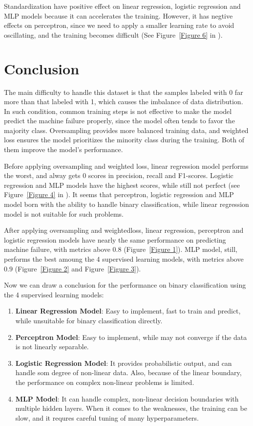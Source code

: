 \documentclass{article}
\begin{document}
Standardization have positive effect on linear regression, logistic regression and MLP
models because it can accelerates the training. However, it has negtive effects on
perceptron, since we need to apply a smaller learning rate to avoid oscillating, and
the training becomes difficult (See Figure~\ref{Figure 6} in ).

\section{Conclusion}
The main difficulty to handle this dataset is that the samples labeled with 0 far more
than that labeled with 1, which causes the imbalance of data distribution. In such
condition, common training steps is not effective to make the model predict the
machine failure properly, since the model often tends to favor the majority class.
Oversampling provides more balanced training data, and weighted loss ensures the model
prioritizes the minority class during the training. Both of them improve the model's
performance.

Before applying oversampling and weighted loss, linear regression model performs the
worst, and alway gets 0 scores in precision, recall and F1-scores. Logistic regression and
MLP models have the highest scores, while still not perfect (see Figure~\ref{Figure 4} in ). 
It seems that perceptron, logistic
regression and MLP model born with the ability to handle binary classification, while
linear regression model is not suitable for such problems.

After applying oversampling and weightedloss, linear regression, perceptron and 
logistic regression models have nearly the same performance on predicting machine 
failure, with metrics above $0.8$ (Figure~\ref{Figure 1}). MLP model, still, performs the best amoung the
4 supervised learning models, with metrics above $0.9$ (Figure~\ref{Figure 2} and Figure~\ref{Figure 3}).

Now we can draw a conclusion for the performance on binary classification using the
4 supervised learning models:
\begin{enumerate}
    \item \textbf{Linear Regression Model}: Easy to implement, fast to train and
    predict, while unsuitable for binary classification directly.
    \item \textbf{Perceptron Model}: Easy to implement, while may not converge if the data
    is not linearly separable.
    \item \textbf{Logistic Regression Model}: It provides probabilistic output, and can
    handle som degree of non-linear data. Also, because of the linear boundary, the
    performance on complex non-linear problems is limited.
    \item \textbf{MLP Model}: It can handle complex, non-linear decision boundaries with
    multiple hidden layers. When it comes to the weaknesses, the training can be slow,
    and it requres careful tuning of many hyperparameters.
\end{enumerate} 
\end{document}
